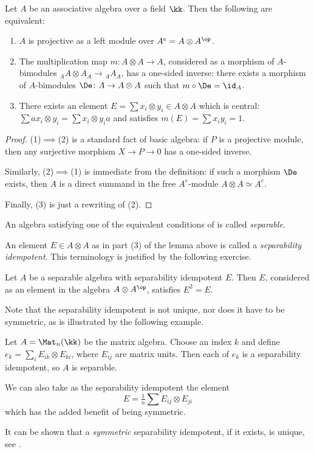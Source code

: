 \begin{lemma}\label{l:separable}
  Let $A$ be an associative algebra over a field $\kk$.
  Then the following are equivalent:
  \begin{enumerate}
    \item $A$ is projective as a left module over $A^e=A\otimes A^\op$.
    \item The multiplication map $m\colon A\otimes A\to A$,
      considered as a morphism of $A$-bimodules
      ${}_AA\otimes A_A \to {}_A A_A$,
      has a one-sided inverse: there exists a morphism of $A$-bimodules
      $\De\colon A\to A\otimes A$ such that $m\circ \De=\id_A$.
   \item There exists an element $E=\sum x_i\otimes y_i\in A\otimes A$ which
     is central: $\sum ax_i \otimes y_i=\sum x_i \otimes y_ia$ and satisfies
     $m(E)=\sum x_iy_i=1$.
   \end{enumerate}
\end{lemma}
\begin{proof}
  (1)$\implies$(2) is a standard fact of basic algebra: if $P$ is a projective
  module, then any surjective morphism $X\to P\to 0$ has a one-sided inverse.

  Similarly, (2)$\implies$(1) is immediate from the definition: if such a
  morphism $\De$ exists, then $A$ is a direct summand in
  the free $A^e$-module $A\otimes A\simeq A^e$.

  Finally, (3) is just a rewriting of (2).
\end{proof}
\begin{definition}\label{d:separable}
  An algebra satisfying one of the equivalent conditions of 
  is called \emph{separable}.
\end{definition}
An element $E\in A\otimes A$ as in part (3) of the lemma above is called a
\emph{separability idempotent}. This terminology
is justified by the following exercise.
\begin{exercise}\label{ec:separability-idempotent}
  Let $A$ be a separable algebra with separability idempotent $E$.
  Then $E$, considered as an element in the algebra $A\otimes A^\op$,
  satisfies $E^2=E$.
\end{exercise}


Note that the separability idempotent is not unique, nor does it have
to be symmetric, as is illustrated by the following example.
\begin{example}\label{x:matrix}
  Let $A=\Mat_n(\kk)$ be the matrix algebra. Choose an index $k$ and define
  $e_k=\sum_i E_{ik}\otimes E_{ki}$, where $E_{ij}$ are matrix units.
  Then each of $e_k$ is a separability idempotent, so $A$ is separable.

  We can also take as the separability idempotent the element
  $$
    E=\tfrac{1}{n}\sum E_{ij}\otimes E_{ji}
  $$
  which has the added benefit of being symmetric.
\end{example}
\begin{remark}
  It can be shown that a \emph{symmetric} separability idempotent, if it exists, is
  unique, see \cite[Theorem 3.1]{aguiar}.
\end{remark}


